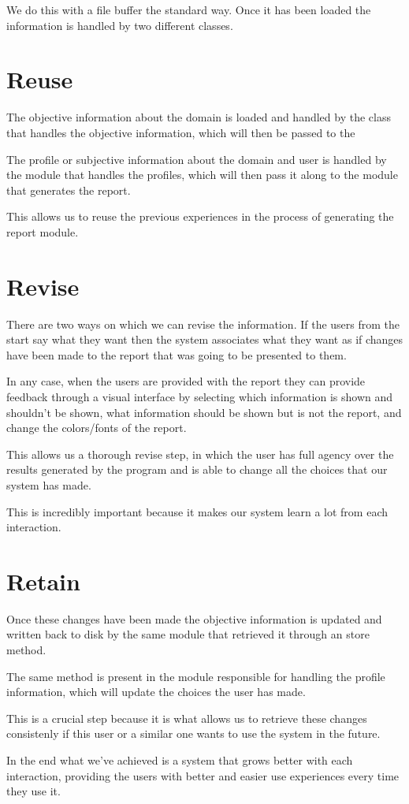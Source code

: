 We do this with a file buffer the standard way. Once it has been loaded the information is handled by two different classes.

\section{Reuse}
\label{cap1:sec:reuse}
The objective information about the domain is loaded and handled by the class that handles the objective information, which will then be passed to the 

The profile or subjective information about the domain and user is handled by the module that handles the profiles, which will then pass it along to the module that generates the report.

This allows us to reuse the previous experiences in the process of generating the report module.

\section{Revise}
\label{cap1:sec:revise}
There are two ways on which we can revise the information. If the users from the start say what they want then the system associates what they want as if changes have been made to the report that was going to be presented to them.

In any case, when the users are provided with the report they can provide feedback through a visual interface by selecting which information is shown and shouldn't be shown, what information should be shown but is not the report, and change the colors/fonts of the report.

This allows us a thorough revise step, in which the user has full agency over the results generated by the program and is able to change all the choices that our system has made.

This is incredibly important because it makes our system learn a lot from each interaction.

\section{Retain}
\label{cap1:sec:retain}
Once these changes have been made the objective information is updated and written back to disk by the same module that retrieved it through an store method.

The same method is present in the module responsible for handling the profile information, which will update the choices the user has made.

This is a crucial step because it is what allows us to retrieve these changes consistenly if this user or a similar one wants to use the system in the future.

In the end what we've achieved is a system that grows better with each interaction, providing the users with better and easier use experiences every time they use it.

